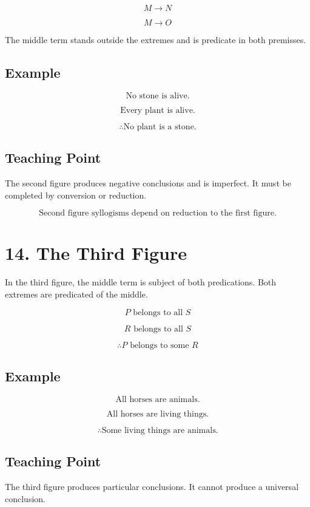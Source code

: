\documentclass[12pt]{article}
\begin{document}
\[
M \rightarrow N
\]

\[
M \rightarrow O
\]

The middle term stands outside the extremes and is predicate in both premisses.

\subsection*{Example}

\[
\text{No stone is alive.}
\]

\[
\text{Every plant is alive.}
\]

\[
\therefore \text{No plant is a stone.}
\]

\subsection*{Teaching Point}

The second figure produces negative conclusions and is imperfect. It must be
completed by conversion or reduction.

\[
\boxed{
\text{Second figure syllogisms depend on reduction to the first figure.}
}
\]

\section*{14. The Third Figure}

In the third figure, the middle term is subject of both predications. Both
extremes are predicated of the middle.

\[
P \text{ belongs to all } S
\]

\[
R \text{ belongs to all } S
\]

\[
\therefore P \text{ belongs to some } R
\]

\subsection*{Example}

\[
\text{All horses are animals.}
\]

\[
\text{All horses are living things.}
\]

\[
\therefore \text{Some living things are animals.}
\]

\subsection*{Teaching Point}

The third figure produces particular conclusions. It cannot produce a universal
conclusion.
\end{document}
